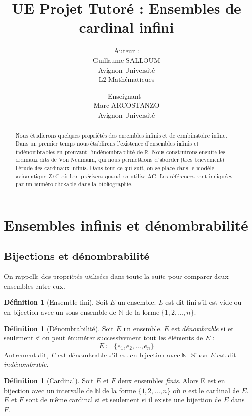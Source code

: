\documentclass{article}
\title{UE Projet Tutoré : Ensembles de cardinal infini}
\author{Auteur :\\
	Guillaume SALLOUM \\ 
	Avignon Université \\ 
	L2 Mathématiques
	\and
	Enseignant : \\
	Marc ARCOSTANZO \\
	Avignon Université}
\date{}
\theoremstyle{definition}
\newtheorem{definition}[subsubsection]{Définition}
\theoremstyle{plain}
\theoremstyle{plain}
\theoremstyle{plain}
\theoremstyle{plain}
\begin{document}
\maketitle
\begin{abstract}
	Nous étudierons quelques propriétés des ensembles infinis et de combinatoire infine.
	Dans un premier temps nous établirons l'existence d'ensembles infinis et indénombrables en prouvant l'indénombrabilité de \( \mathbb{R} \). 
	Nous construirons ensuite les ordinaux dits de Von Neumann, qui nous permettrons d'aborder (très brièvement) l'étude des cardinaux infinis.
	Dans tout ce qui suit, on se place dans le modèle axiomatique ZFC où l'on précisera quand on utilise AC. Les références sont indiquées par un numéro clickable dans la bibliographie.
\end{abstract}

\tableofcontents
\section{Ensembles infinis et dénombrabilité}
\subsection{Bijections et dénombrabilité}

On rappelle des propriétés utilisées dans toute la suite pour comparer deux ensembles entre eux.

\begin{definition}[Ensemble fini]
	Soit \( E \) un ensemble.
	\( E \) est dit fini s'il est vide ou en bijection avec un sous-ensemble de \( \mathbb{N} \) de la forme \( \{1, 2, \ldots, n\} \).
\end{definition}

\begin{definition}[Dénombrabilité]
	Soit \( E \) un ensemble. \( E \) est \textit{dénombrable} si et seulement si on peut énumérer successivement tout les éléments de \( E \) :
\begin{equation*}
	E \coloneqq \{e_{1}, e_{2}, \ldots, e_{n}\} 
\end{equation*} 
	Autrement dit, \( E \) est dénombrable s'il est en bijection avec \( \mathbb{N} \). Sinon \( E \) est dit \textit{indénombrable}.
\end{definition}
\begin{definition}[Cardinal]
	Soit \( E \) et \( F \) deux ensembles \textit{finis}.
	Alors E est en bijection avec un intervalle de \( \mathbb{N} \) de la forme \( \{1, 2, \ldots, n\} \) où \textit{n} est le cardinal de \( E \). \\
	\( E \) et \( F \) sont de même cardinal si et seulement si il existe une bijection de \( E \) dans \( F \).
\
\end{definition}
\end{document}

